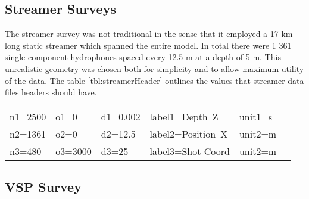 \subsection{Streamer Surveys}
The streamer survey was not traditional in the sense that it employed a 17 km long static streamer which spanned the entire
model.  In total there were 1 361 single component hydrophones spaced every 12.5 m at a depth of 5 m.  This unrealistic geometry
was chosen both for simplicity and to allow maximum utility of the data.  The table \ref{tbl:streamerHeader} outlines the 
values that streamer data files headers should have.    

{
\begin{tabular}[t]{|llllll|}
        \hline
        n1=2500    &   o1=0     &   d1=0.002    &    label1=Depth\ Z     &  unit1=s  &  \\
        n2=1361    &   o2=0     &   d2=12.5     &    label2=Position\ X  &  unit2=m  &  \\
	n3=480 	   &   o3=3000  &   d3=25	&    label3=Shot-Coord   &  unit2=m  &  \\
        \hline
\end{tabular}
}

\subsection{VSP Survey}
